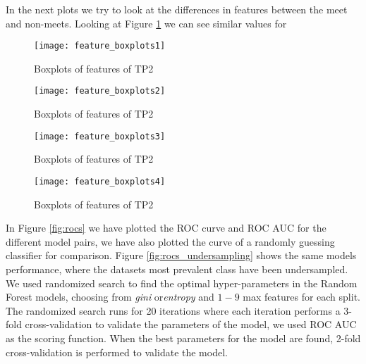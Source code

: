 In the next plots we try to look at the differences in features between the meet and non-meets.
Looking at Figure \ref{fig:feature_boxplots1} we can see similar values for 

\begin{figure}[H]
    \hspace*{-1.0cm}
    \centering
    \texttt{[image: feature\_boxplots1]}
    \caption{Boxplots of features of TP2}
    \label{fig:feature_boxplots1}
\end{figure}

\begin{figure}[H]
    \hspace*{-1.0cm}
    \centering
    \texttt{[image: feature\_boxplots2]}
    \caption{Boxplots of features of TP2}
    \label{fig:feature_boxplots2}
\end{figure}
\begin{figure}[H]
    \hspace*{-1.0cm}
    \centering
    \texttt{[image: feature\_boxplots3]}
    \caption{Boxplots of features of TP2}
    \label{fig:feature_boxplots3}
\end{figure}
\begin{figure}[H]
    \hspace*{-1.0cm}
    \centering
    \texttt{[image: feature\_boxplots4]}
    \caption{Boxplots of features of TP2}
    \label{fig:feature_boxplots4}
\end{figure}
In Figure \ref{fig:rocs} we have plotted the ROC curve and ROC AUC for the different model pairs, we have also plotted the curve of a randomly guessing classifier for comparison. Figure \ref{fig:rocs_undersampling} shows the same models performance, where the datasets most prevalent class have been undersampled. We used randomized search to find the optimal hyper-parameters in the Random Forest models, choosing from \textit{gini} or\textit{entropy} and $1-9$ max features for each split. The randomized search runs for 20 iterations where each iteration performs a 3-fold cross-validation to validate the parameters of the model, we used ROC AUC as the scoring function. When the best parameters for the model are found, 2-fold cross-validation is performed to validate the model.

